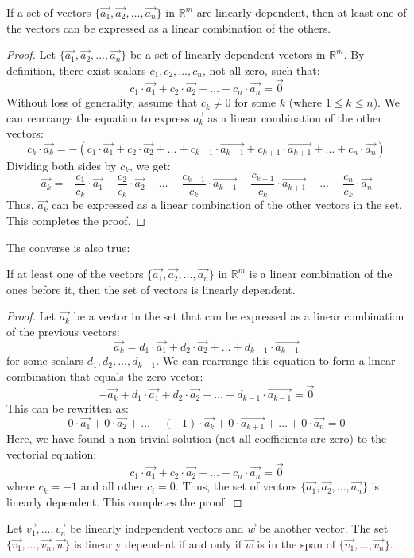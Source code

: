 \begin{theorem}
    If a set of vectors $\{\vec{a_1}, \vec{a_2}, \ldots, \vec{a_n}\}$ in $\mathbb{R}^m$ are linearly dependent, then at least one of the vectors can be expressed as a linear combination of the others.
\end{theorem}
\begin{proof}
    Let $\{\vec{a_1}, \vec{a_2}, \ldots, \vec{a_n}\}$ be a set of linearly dependent vectors in $\mathbb{R}^m$. By definition, there exist scalars $c_1, c_2, \ldots, c_n$, not all zero, such that:
    \[
        c_1 \cdot \vec{a_1} + c_2 \cdot \vec{a_2} + \ldots + c_n \cdot \vec{a_n} = \vec{0}
    \]
    Without loss of generality, assume that $c_k \neq 0$ for some $k$ (where $1 \leq k \leq n$). We can rearrange the equation to express $\vec{a_k}$ as a linear combination of the other vectors:
    \[
        c_k \cdot \vec{a_k} = - (c_1 \cdot \vec{a_1} + c_2 \cdot \vec{a_2} + \ldots + c_{k-1} \cdot \vec{a_{k-1}} + c_{k+1} \cdot \vec{a_{k+1}} + \ldots + c_n \cdot \vec{a_n})
    \]
    Dividing both sides by $c_k$, we get:
    \[
        \vec{a_k} = -\frac{c_1}{c_k} \cdot \vec{a_1} -\frac{c_2}{c_k} \cdot \vec{a_2} - \ldots -\frac{c_{k-1}}{c_k} \cdot \vec{a_{k-1}} -\frac{c_{k+1}}{c_k} \cdot \vec{a_{k+1}} - \ldots -\frac{c_n}{c_k} \cdot \vec{a_n}
    \]
    Thus, $\vec{a_k}$ can be expressed as a linear combination of the other vectors in the set. This completes the proof.
\end{proof}
The converse is also true:
\begin{theorem}
    If at least one of the vectors $\{\vec{a_1}, \vec{a_2}, \ldots, \vec{a_n}\}$ in $\mathbb{R}^m$ is a linear combination of the ones before it, then the set of vectors is linearly dependent.
\end{theorem}
\begin{proof}
    Let $\vec{a_k}$ be a vector in the set that can be expressed as a linear combination of the previous vectors:
    \[
        \vec{a_k} = d_1 \cdot \vec{a_1} + d_2 \cdot \vec{a_2} + \ldots + d_{k-1} \cdot \vec{a_{k-1}}
    \]
    for some scalars $d_1, d_2, \ldots, d_{k-1}$. We can rearrange this equation to form a linear combination that equals the zero vector:
    \[
        -\vec{a_k} + d_1 \cdot \vec{a_1} + d_2 \cdot \vec{a_2} + \ldots + d_{k-1} \cdot \vec{a_{k-1}} = \vec{0}
    \]
    This can be rewritten as:
    \[
        0 \cdot \vec{a_1} + 0 \cdot \vec{a_2} + \ldots + (-1) \cdot \vec{a_k} + 0 \cdot \vec{a_{k+1}} + \ldots + 0 \cdot \vec{a_n} = 0
    \]
    Here, we have found a non-trivial solution (not all coefficients are zero) to the vectorial equation:
    \[
        c_1 \cdot \vec{a_1} + c_2 \cdot \vec{a_2} + \ldots + c_n \cdot \vec{a_n} = \vec{0}
    \]
    where $c_k = -1$ and all other $c_i = 0$. Thus, the set of vectors $\{\vec{a_1}, \vec{a_2}, \ldots, \vec{a_n}\}$ is linearly dependent. This completes the proof.
\end{proof}
Let $\vec{v_1}, ..., \vec{v_n}$ be linearly independent vectors and $\vec{w}$ be another vector. The set $\{\vec{v_1}, ..., \vec{v_n}, \vec{w}\}$ is linearly dependent if and only if $\vec{w}$ is in the span of $\{\vec{v_1}, ..., \vec{v_n}\}$.

